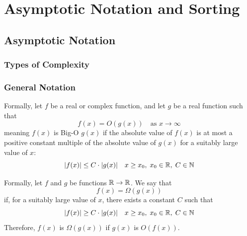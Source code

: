 \section{Asymptotic Notation and Sorting}\label{ads:section:2.ans}

\subsection{Asymptotic Notation}

\subsubsection{Types of Complexity}




\subsubsection{General Notation}

 Formally, let \(f\) be a real or complex function, and let \(g\) be a real function such that
\begin{equation}
    f(x) = O(g(x)) \quad\text{as } x \rightarrow \infty
\end{equation}
meaning \(f(x)\) is Big-O \(g(x)\) if the absolute value of \(f(x)\) is at most a positive constant multiple of the absolute value of \(g(x)\) for a suitably large value of \(x\):
\begin{equation}
    |f(x)| \leq C \cdot |g(x)| \quad x \geq x_0, \; x_0 \in \mathbb{R}, \; C \in \mathbb{N}
\end{equation}

 Formally, let \(f\) and \(g\) be functions \(\mathbb{R} \rightarrow \mathbb{R}\). We say that 
\begin{equation}
    f(x) = \Omega(g(x))
\end{equation}
if, for a suitably large value of \(x\), there exists a constant \(C\) such that
\begin{equation}
    |f(x)| \geq C \cdot |g(x)| \quad x \geq x_0, \; x_0 \in \mathbb{R}, \; C \in \mathbb{N}
\end{equation}
Therefore, \(f(x)\) is \(\Omega(g(x))\) if \(g(x)\) is \(O(f(x))\).

